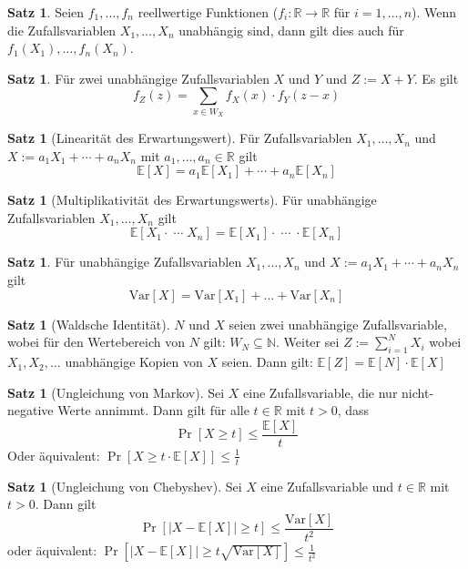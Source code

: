 \documentclass[a4paper, 10pt]{article}
\theoremstyle{definition}
\newtheorem{theorem}[definition]{Satz}
\theoremstyle{named}
\newcommand{\R}{\mathbb{R}}
\newcommand{\N}{\mathbb{N}}
\newcommand{\E}{\mathbb{E}}
\newcommand{\Var}{\text{Var}}
\begin{document}
\begin{theorem}
    Seien $f_1, \ldots, f_n$ reellwertige Funktionen ($f_i: \R \to \R$ für $i = 1, \ldots, n$). Wenn die Zufallsvariablen $X_1, \ldots, X_n$ unabhängig sind, dann gilt dies auch für $f_1(X_1), \ldots, f_n(X_n)$.
\end{theorem}

\setcounter{definition}{57}
\begin{theorem}
    Für zwei unabhängige Zufallsvariablen $X$ und $Y$ und $Z := X + Y$. Es gilt
    $$f_Z(z) = \sum_{x \in W_X} f_X(x) \cdot f_Y(z - x)$$
\end{theorem}

\setcounter{definition}{59}
\begin{theorem}[Linearität des Erwartungswert]
    Für Zufallsvariablen $X_1, \ldots, X_n$ und $X := a_1 X_1 + \cdots + a_n X_n$ mit $a_1, \ldots, a_n \in \R$ gilt
    $$\E[X] = a_1 \E[X_1] + \cdots + a_n \E[X_n]$$
\end{theorem}

\begin{theorem}[Multiplikativität des Erwartungswerts]
    Für unabhängige Zufallsvariablen $X_1, \ldots, X_n$ gilt
    $$\E[X_1 \cdot \; \cdots \; X_n] = \E[X_1] \cdot \; \cdots \; \cdot \E[X_n]$$
\end{theorem}

\begin{theorem}
    Für unabhängige Zufallsvariablen $X_1, \ldots, X_n$  und $X := a_1 X_1 + \cdots + a_n X_n$ gilt
    $$\Var[X] = \Var[X_1] + \ldots + \Var[X_n]$$
\end{theorem}

\setcounter{definition}{59}
\begin{theorem}[Waldsche Identität]
    $N$ und $X$ seien zwei unabhängige Zufallsvariable, wobei für den Wertebereich von $N$ gilt: $W_N \subseteq \N$. Weiter sei $Z := \sum_{i=1}^N X_i$
    wobei $X_1, X_2, \ldots$ unabhängige Kopien von $X$ seien. Dann gilt: $\E[Z] = \E[N] \cdot \E[X]$
\end{theorem}

\setcounter{definition}{66}
\begin{theorem}[Ungleichung von Markov]
    Sei $X$ eine Zufallsvariable, die nur nicht-negative Werte annimmt. Dann gilt für alle $t \in \R$ mit $t > 0$, dass
    $$\Pr[X \geq t] \leq \frac{\E[X]}{t}$$
    Oder äquivalent: $\Pr[X \geq t \cdot \E[X]] \leq \frac{1}{t}$
\end{theorem}

\begin{theorem}[Ungleichung von Chebyshev]
    Sei $X$ eine Zufallsvariable und $t \in \R$ mit $t > 0$. Dann gilt
    $$\Pr[|X - \E[X]| \geq t] \leq \frac{\Var[X]}{t^2}$$
    oder äquivalent: $\Pr[|X - \E[X]| \geq t \sqrt{\Var[X]}] \leq \frac{1}{t^2}$
\end{theorem}
\end{document}
